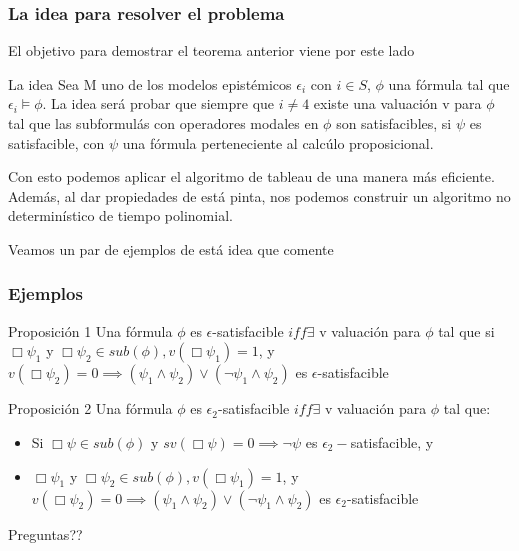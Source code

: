 \documentclass{beamer}
\begin{document}
\begin{frame}
\frametitle{La idea para resolver el problema}

El objetivo para demostrar el teorema anterior viene por este lado

\begin{block}{La idea}
Sea M uno de los modelos epist\'emicos $\epsilon_{i}$ con $i \in S$, $\phi$ una f\'ormula tal que $\epsilon_{i} \models \phi$. La idea ser\'a probar que siempre que $i \neq 4$ existe una valuaci\'on v para $\phi$ tal que las subformul\'as con operadores modales en $\phi$ son satisfacibles, si $\psi$ es satisfacible, con $\psi$ una f\'ormula perteneciente al calc\'ulo proposicional.
\end{block}

Con esto podemos aplicar el algoritmo de tableau de una manera m\'as eficiente. Adem\'as, al dar propiedades de est\'a pinta, nos podemos construir un algoritmo no determin\'istico de tiempo polinomial.

Veamos un par de ejemplos de est\'a idea que comente
\end{frame}

\begin{frame}
\frametitle{Ejemplos}

\begin{block}{Proposici\'on 1}
Una f\'ormula $\phi$ es $\epsilon$-satisfacible $iff \exists$ v valuaci\'on para $\phi$ tal que si $\Box\psi_{1}$ y $\Box \psi_{2} \in sub(\phi), v(\Box \psi_{1}) = 1$, y $v(\Box \psi_{2}) = 0 \implies (\psi_{1} \land \psi_{2}) \lor (\neg \psi_{1} \land \psi_{2})$ es $\epsilon$-satisfacible
\end{block}

\begin{block}{Proposici\'on 2}
Una f\'ormula $\phi$ es $\epsilon_{2}$-satisfacible $iff \exists$ v valuaci\'on para $\phi$ tal que: 
\begin{itemize}
\item Si $\Box\psi \in sub(\phi)$ y  $sv(\Box \psi) = 0 \implies \neg \psi$ es $\epsilon_{2}-$satisfacible, y 
\item $\Box\psi_{1}$ y $\Box \psi_{2} \in sub(\phi), v(\Box \psi_{1}) = 1$, y $v(\Box \psi_{2}) = 0 \implies (\psi_{1} \land \psi_{2}) \lor (\neg \psi_{1} \land \psi_{2})$ es $\epsilon_{2}$-satisfacible
\end{itemize}
\end{block}

\end{frame}


\begin{frame}
\Huge{\centerline{Preguntas??}}
\end{frame}

\end{document}
